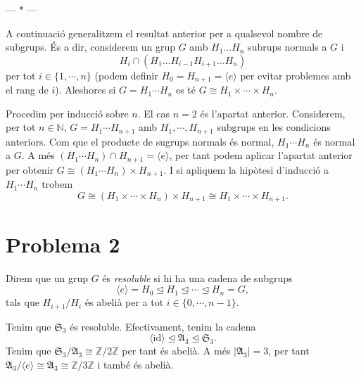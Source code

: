 \documentclass[12pt]{article}
\renewcommand{\S}{\mathfrak{S}}
\newcommand{\A}{\mathfrak{A}}
\newcommand{\Z}{\mathbb{Z}}
\newcommand{\gen}[1]{\langle #1 \rangle}
\newcommand{\abs}[1]{\left\lvert #1 \right\rvert}
\newcommand{\normal}{\trianglelefteq}
\newcommand{\id}{\mathrm{id}}
\newcommand{\parbreak}{
	\begin{center}
		--- $\ast$ ---
	\end{center} 
}
\begin{document}
\parbreak

A continuació generalitzem el resultat anterior per a qualsevol nombre de subgrups. És a dir, considerem un grup \( G \) amb \( H_1 \dots H_n \) subrups normals a \( G \) i 
\begin{equation*}
	H_i \cap \left(H_1 \dots H_{i-1} H_{i+1} \dots H_n\right) 
\end{equation*}
per tot \( i \in \{1, \cdots, n\} \) (podem definir \( H_0 = H_{n+1} = \gen{e} \) per evitar problemes amb el rang de \( i \)). Aleshores si \( G = H_1\cdots H_n \) es té \( G \cong H_1 \times \cdots \times H_n \).

Procedim per inducció sobre \( n \). El cas \( n = 2 \) és l'apartat anterior. Considerem, per tot \( n \in \mathbb{N} \), \( G = H_1 \cdots H_{n+1} \) amb \( H_1, \cdots , H_{n+1} \) subgrups en les condicions anteriors. Com que el producte de sugrups normals és normal, \( H_1\cdots H_n \) és normal a \( G \). A més \( \left(H_1 \cdots H_n \right) \cap H_{n+1} = \gen{e} \), per tant podem aplicar l'apartat anterior per obtenir \( G \cong \left(H_1 \cdots H_n\right) \times H_{n+1} \). I si apliquem la hipòtesi d'inducció a \( H_1 \cdots H_n \) trobem 
\begin{equation*}
	G \cong \left(H_1 \times \cdots \times H_n\right) \times H_{n+1} \cong H_1 \times \cdots \times H_{n+1}.
\end{equation*}

\pagebreak
\section{Problema 2}
Direm que un grup \( G \) és \emph{resoluble} si hi ha una cadena de subgrups
\begin{equation*}
	\gen{e} = H_0 \normal H_1 \normal \cdots \normal H_n = G,
\end{equation*}
tals que \( H_{i+1}/H_i \) és abelià per a tot \( i \in \{0,\cdots , n -1 \} \). 

Tenim que \( \S_3 \) és resoluble. Efectivament, tenim la cadena 
\begin{equation*}
	\gen{\id} \normal \A_3 \normal \S_3.
\end{equation*}
Tenim que \( \S_3/\A_3 \cong \Z / 2\Z \) per tant és abelià. A més \( \abs{\A_3} = 3 \), per tant \( \A_3 / \gen{e} \cong \A_3 \cong \Z / 3\Z \) i també és abelià.  
\end{document}
